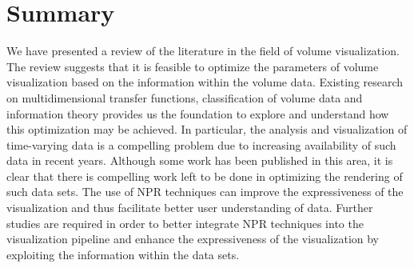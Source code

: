 \section{Summary}
We have presented a review of the literature in the field of volume visualization.
The review suggests that it is feasible to optimize the parameters of volume visualization based on the information within the volume data. Existing research on multidimensional transfer functions, classification of volume data and information theory provides us the foundation to explore and understand how this optimization may be achieved.
In particular, the analysis and visualization of time-varying data is a compelling problem due to increasing availability of such data in recent years. Although some work has been published in this area, it is clear that there is compelling work left to be done in optimizing the rendering of such data sets.
The use of NPR techniques can improve the expressiveness of the visualization and thus facilitate better user understanding of data.
Further studies are required in order to better integrate NPR techniques into the visualization pipeline and enhance the expressiveness of the visualization by exploiting the information within the data sets.


